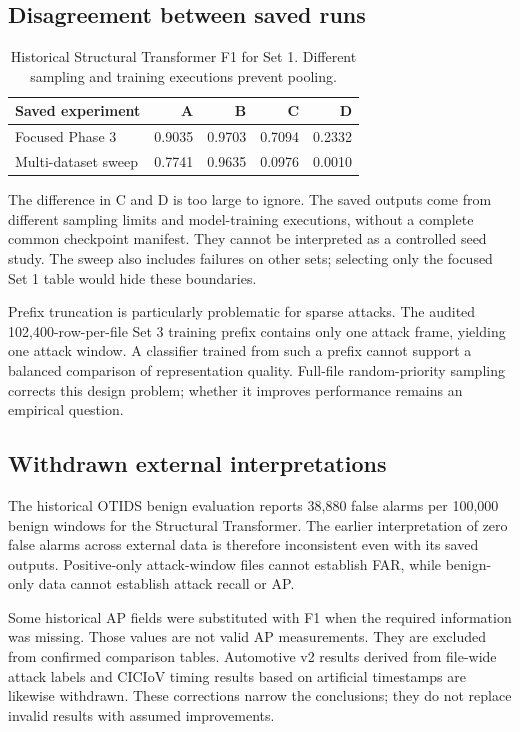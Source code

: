 \documentclass[12pt,a4paper,oneside,openany]{extbook}
\begin{document}
\subsection{Disagreement between saved runs}

\begin{table}[htbp]\centering
\caption{Historical Structural Transformer F1 for Set 1. Different sampling and training executions prevent pooling.}\label{tab:disagreement}
\begin{tabular}{lrrrr}\toprule
Saved experiment & A & B & C & D\\\midrule
Focused Phase 3 & 0.9035 & 0.9703 & 0.7094 & 0.2332\\
Multi-dataset sweep & 0.7741 & 0.9635 & 0.0976 & 0.0010\\\bottomrule
\end{tabular}
\end{table}

The difference in C and D is too large to ignore. The saved outputs come from different sampling limits and model-training executions, without a complete common checkpoint manifest. They cannot be interpreted as a controlled seed study. The sweep also includes failures on other sets; selecting only the focused Set 1 table would hide these boundaries.

Prefix truncation is particularly problematic for sparse attacks. The audited 102,400-row-per-file Set 3 training prefix contains only one attack frame, yielding one attack window. A classifier trained from such a prefix cannot support a balanced comparison of representation quality. Full-file random-priority sampling corrects this design problem; whether it improves performance remains an empirical question.

\subsection{Withdrawn external interpretations}
The historical OTIDS benign evaluation reports 38,880 false alarms per 100,000 benign windows for the Structural Transformer. The earlier interpretation of zero false alarms across external data is therefore inconsistent even with its saved outputs. Positive-only attack-window files cannot establish FAR, while benign-only data cannot establish attack recall or AP.

Some historical AP fields were substituted with F1 when the required information was missing. Those values are not valid AP measurements. They are excluded from confirmed comparison tables. Automotive v2 results derived from file-wide attack labels and CICIoV timing results based on artificial timestamps are likewise withdrawn. These corrections narrow the conclusions; they do not replace invalid results with assumed improvements.
\end{document}
